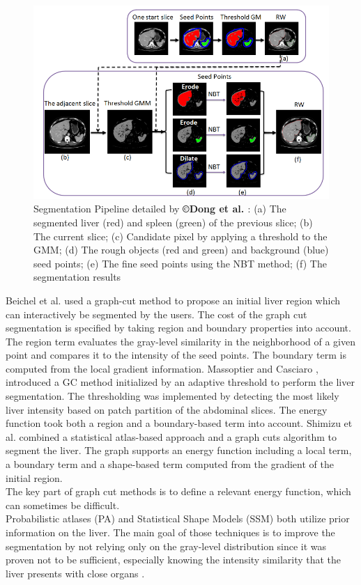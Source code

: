 \begin{figure}[th!]
	\centering
	\includegraphics[width=0.7\linewidth]{images/Dong2016_Fig3_v2}
	\caption{Segmentation Pipeline detailed by \textbf{©Dong et al. \cite{Dong2016}}: (a) The segmented liver (red) and spleen (green) of the previous slice; (b) The current slice; (c) Candidate pixel by applying a threshold to the GMM; (d) The rough objects (red and green) and background (blue) seed points; (e) The fine seed points using the NBT method; (f) The segmentation results}
	\label{Dong2016_Fig3}
\end{figure}


Beichel et al. \cite{Beichel2004} used a graph-cut method to propose an initial liver
region which can interactively be segmented by the users. The cost of
the graph cut segmentation is specified by taking region and boundary
properties into account. The region term evaluates the gray-level
similarity in the neighborhood of a given point and compares it to the
intensity of the seed points. The boundary term is computed from the
local gradient information.
Massoptier and Casciaro \cite{Massoptier2007}, introduced a GC method initialized by an adaptive
threshold to perform the liver segmentation. The thresholding was implemented by detecting the most likely
liver intensity based on patch partition of the abdominal slices. The
energy function took both a region and a boundary-based term into
account.
Shimizu et al. \cite{Shimizu2011} combined a statistical atlas-based approach and a graph
cuts algorithm to segment the liver. The graph supports an energy
function including a local term, a boundary term and a shape-based term
computed from the gradient of the initial region.\\
The key part of graph cut methods is to define a relevant energy
function, which can sometimes be difficult.\\
Probabilistic atlases (PA) and Statistical Shape Models (SSM) both
utilize prior information on the liver. The main goal of those
techniques is to improve the segmentation by not relying only on the
gray-level distribution since it was proven not to be sufficient,
especially knowing the intensity similarity that the liver presents with
close organs \cite{Zhou2006, Park2003, Slagmolen2007, Rikxoort2007}.

